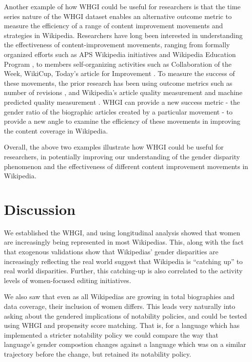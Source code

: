 \documentclass{sig-alternate-05-2015}
\begin{document}
Another example of how WHGI could be useful for researchers is that the time series nature of the WHGI dataset enables an alternative outcome metric to measure the efficiency of a range of content improvement movements and strategies in Wikipedia. Researchers have long been interested in understanding the effectiveness of content-improvement movements, ranging from formally organized efforts such as APS Wikipedia initiatives \cite{farzan_wikipedia_2013} and Wikipedia Education Program \cite{warncke-wang_success_2015}, to members self-organizing activities such as Collaboration of the Week, WikiCup, Today's article for Improvement \cite{zhu_organizing_2012}\cite{warncke-wang_success_2015}. To measure the success of these movements, the prior research has been using outcome metrics such as number of revisions \cite{zhu_organizing_2012}\cite{farzan_wikipedia_2013}, and Wikipedia's article quality measurement and machine predicted quality measurement \cite{warncke-wang_success_2015}. WHGI can provide a new success metric - the gender ratio of the biographic articles created by a particular movement - to provide a new angle to examine the efficiency of these movements in improving the content coverage in Wikipedia.

Overall, the above two examples illustrate how WHGI could be useful for researchers, in potentially improving our understanding of the gender disparity phenomenon and the effectiveness of different content improvement movements in Wikipedia.

   
\section{Discussion}
We established the WHGI, and using longitudinal analysis showed that women are increasingly being represented in most Wikipedias. This, along with the fact that exogenous validations show that Wiki\-pedias' gender disparities are increasingly reflecting the real world suggest that Wikipedia is ``catching up'' to real world disparities. Further, this catching-up is also correlated to the activity levels of women-focused editing initiatives.

We also saw that even as all Wikipedias are growing in total biographies and data coverage, their inclusion of women differs. This leads very naturally into asking about the gendered implications of notability policies, and could be tested using WHGI and propensity score matching. That is, for a language which has implemented a stricter notability policy we could compare the way that language's gender compostion changes against a language which was on a similar trajectory before the change, but retained its notability policy.
\end{document}
